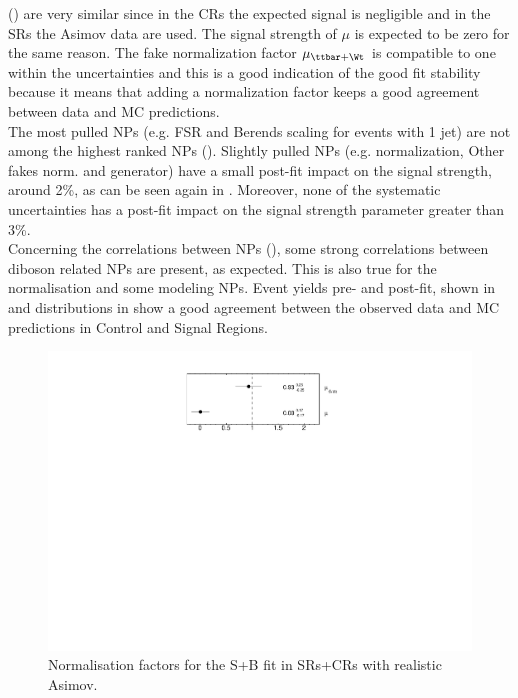 () 
are very similar since in the CRs the expected signal is negligible
and in the SRs the Asimov data are used. 
The signal strength of $\mu$ is expected to be zero for the same reason.
The fake normalization factor $\mu_{\ttbar+\Wt}$ is compatible to one within the uncertainties and
this is a good indication of the good fit stability because it means that adding a normalization factor keeps
a good agreement between data and MC predictions.\\
The most pulled NPs (e.g. \ttbar FSR and \VVHF Berends scaling for events with 1 jet) are
not among the highest ranked NPs (). 
Slightly pulled NPs (e.g. \ttZ normalization, Other fakes norm. and \VVHF generator) have a small post-fit impact on the signal strength, around 2\%, as can be seen again in . Moreover, none of the systematic uncertainties has a post-fit impact on the signal strength parameter greater than 3\%.\\
Concerning the correlations between NPs
(), some strong correlations
between diboson related NPs are present, as expected. This is also
true for the \ttbar normalisation and some \ttbar modeling NPs. 
Event yields pre- and post-fit, shown in  and distributions in  show a good agreement between the observed data and MC predictions in Control and Signal Regions.

\begin{figure}[htbp]
	\centering
	\includegraphics[width=.5\textwidth]{Chapters/CH8/figures/SPLUSB_CRSR_UsingDL1rcFullSys/NormFactors}
	\caption{Normalisation factors for the S+B \tZc fit in SRs+CRs with realistic Asimov.}%
	\label{fig:stat:tzc:splusb:crsr:norm}
\end{figure}

